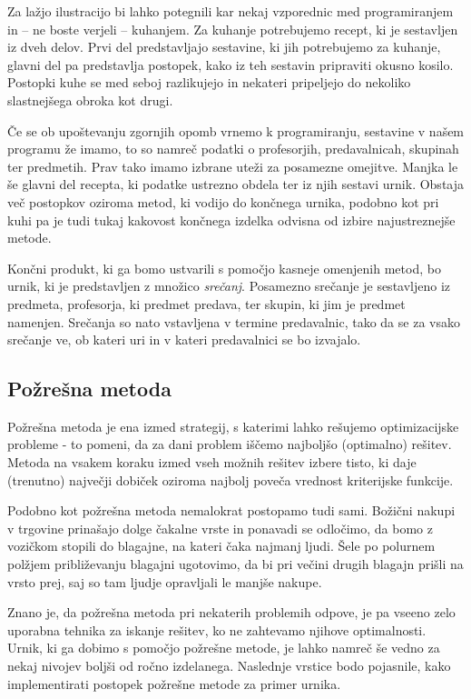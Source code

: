 \documentclass[a4paper,10pt]{article}
\begin{document}
Za lažjo ilustracijo bi lahko potegnili kar nekaj vzporednic med programiranjem in -- ne
boste verjeli -- kuhanjem. Za kuhanje potrebujemo recept, ki je sestavljen iz dveh delov.
Prvi del predstavljajo sestavine, ki jih potrebujemo za kuhanje, glavni del pa predstavlja
postopek, kako iz teh sestavin pripraviti okusno kosilo. Postopki kuhe se med seboj
razlikujejo in nekateri pripeljejo do nekoliko slastnejšega obroka kot drugi.

Če se ob upoštevanju zgornjih opomb vrnemo k programiranju, sestavine v našem programu že
imamo, to so namreč podatki o profesorjih, predavalnicah, skupinah ter predmetih. Prav tako
imamo izbrane uteži za posamezne omejitve. Manjka le še glavni del recepta, ki podatke
ustrezno obdela ter iz njih sestavi urnik. Obstaja več postopkov oziroma metod, ki vodijo
do končnega urnika, podobno kot pri kuhi pa je tudi tukaj kakovost končnega izdelka odvisna
od izbire najustreznejše metode.

Končni produkt, ki ga bomo ustvarili s pomočjo kasneje omenjenih metod, bo urnik, ki je
predstavljen z množico \emph{srečanj}. Posamezno srečanje je sestavljeno iz predmeta,
profesorja, ki predmet predava, ter skupin, ki jim je predmet namenjen. Srečanja so nato
vstavljena v termine predavalnic, tako da se za vsako srečanje ve, ob kateri uri in v
kateri predavalnici se bo izvajalo.

\subsection{Požrešna metoda }

Požrešna metoda je ena izmed strategij, s katerimi lahko rešujemo optimizacijske probleme -
to pomeni, da za dani problem iščemo najboljšo (optimalno) rešitev. Metoda na vsakem koraku
izmed vseh možnih rešitev izbere  tisto, ki daje (trenutno) največji dobiček oziroma najbolj
poveča vrednost kriterijske funkcije.

Podobno kot požrešna metoda nemalokrat postopamo tudi sami. Božični nakupi v trgovine
prinašajo dolge čakalne vrste in ponavadi se odločimo, da bomo z vozičkom stopili do blagajne,
na kateri čaka najmanj ljudi. Šele po polurnem polžjem približevanju blagajni ugotovimo,
da bi pri večini drugih blagajn prišli na vrsto prej, saj so tam ljudje opravljali le
manjše nakupe.

Znano je, da požrešna metoda pri nekaterih problemih odpove, je pa vseeno zelo uporabna
tehnika za iskanje rešitev, ko ne zahtevamo njihove optimalnosti. Urnik, ki ga dobimo s
pomočjo požrešne metode, je lahko namreč še vedno za nekaj nivojev boljši od ročno izdelanega.
Naslednje vrstice bodo pojasnile, kako implementirati postopek požrešne metode za primer urnika.
\end{document}
